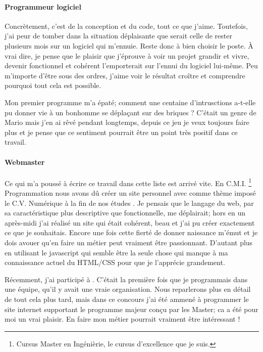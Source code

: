 \documentclass[12pt, a4paper]{report} %
\begin{document}
\paragraph{Programmeur logiciel}
Concrètement, c'est de la conception et du code, tout ce que j'aime. Toutefois, j'ai peur de tomber dans la situation déplaisante que serait celle de rester plusieurs mois sur un logiciel qui m'ennuie. Reste donc à bien choisir le poste. \`A vrai dire, je pense que le plaisir que j'éprouve à voir un projet grandir et vivre, devenir fonctionnel et cohérent l'emporterait sur l'ennui du logiciel lui-même. Peu m'importe d'être sous des ordres, j'aime voir le résultat croître et comprendre pourquoi tout cela est possible. 

Mon premier programme \small{\emph{}} m'a épaté; comment une centaine d'intrusctions a-t-elle pu donner vie à un bonhomme se déplaçant sur des briques ? C'était un genre de Mario mais j'en ai rêvé pendant longtemps, depuis ce jeu je veux toujours faire plus et je pense que ce sentiment pourrait être un point très positif dans ce travail.

\paragraph{Webmaster}
Ce qui m'a poussé à écrire ce travail dans cette liste est arrivé vite. En C.M.I. \footnote{Cursus Master en Ingénièrie, le cursus d'excellence que je suis.} Programmation nous avons dû créer un site personnel avec comme thème imposé le \og C.V. Numérique à la fin de nos études \fg. Je pensais que le langage du web, par sa caractéristique plus descriptive que fonctionnelle, me déplairait; hors en un après-midi j'ai réalisé un site qui était cohérent, beau et j'ai pu créer exactement ce que je souhaitais. Encore une fois cette fierté de donner naissance m'émut et je dois avouer qu'en faire un métier peut vraiment être passionnant. D'autant plus en utilisant le javascript qui semble être la seule chose qui manque à ma connaissance actuel du HTML/CSS pour que je l'apprécie grandement.

Récemment, j'ai participé à \og \lni \fg . C'était la première fois que je programmais dans une équipe, qu'il y avait une vraie organisation. Nous reparlerons plus en détail de tout cela plus tard, mais dans ce concours j'ai été ammené à programmer le site internet supportant le programme majeur conçu par les Master; ca a été pour moi un vrai plaisir. En faire mon métier pourrait vraiment être intéressant !
\end{document}
